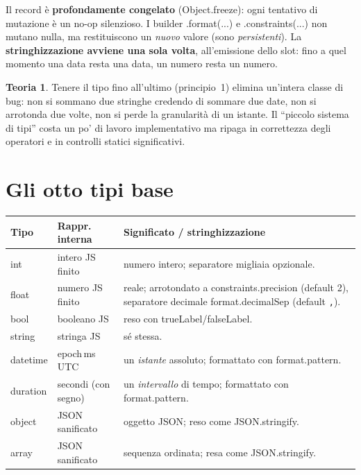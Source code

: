 \documentclass[11pt,a4paper]{book}
\newcommand{\ic}[1]{{\ttfamily #1}}
\theoremstyle{definition}
\newtheorem*{teoria}{Teoria}
\begin{document}
{{{{Il record è \textbf{profondamente congelato} (\ic{Object.freeze}): ogni tentativo
di mutazione è un no-op silenzioso. I builder \ic{.format(...)} e
\ic{.constraints(...)} non mutano nulla, ma restituiscono un \emph{nuovo} valore
(sono \emph{persistenti}). La \textbf{stringhizzazione avviene una sola volta},
all'emissione dello slot: fino a quel momento una data resta una data, un numero
resta un numero.

\begin{teoria}
Tenere il tipo fino all'ultimo (principio~1) elimina un'intera classe di bug: non
si sommano due stringhe credendo di sommare due date, non si arrotonda due volte,
non si perde la granularità di un istante. Il ``piccolo sistema di tipi'' costa un
po' di lavoro implementativo ma ripaga in correttezza degli operatori e in
controlli statici significativi.
\end{teoria}

\section{Gli otto tipi base}

\begin{center}
\small
\begin{tabular}{@{}l l p{7.6cm}@{}}
\toprule
\textbf{Tipo} & \textbf{Rappr. interna} & \textbf{Significato / stringhizzazione} \\
\midrule
\ic{int} & intero JS finito & numero intero; separatore migliaia opzionale. \\
\ic{float} & numero JS finito & reale; arrotondato a \ic{constraints.precision}
(default 2), separatore decimale \ic{format.decimalSep} (default \verb|,|). \\
\ic{bool} & booleano JS & reso con \ic{trueLabel}/\ic{falseLabel}. \\
\ic{string} & stringa JS & sé stessa. \\
\ic{datetime} & epoch\,ms UTC & un \emph{istante} assoluto; formattato con
\ic{format.pattern}. \\
\ic{duration} & secondi (con segno) & un \emph{intervallo} di tempo; formattato
con \ic{format.pattern}. \\
\ic{object} & JSON sanificato & oggetto JSON; reso come \ic{JSON.stringify}. \\
\ic{array} & JSON sanificato & sequenza ordinata; resa come \ic{JSON.stringify}. \\
\bottomrule
\end{tabular}
\end{center}

}}}}
\end{document}
